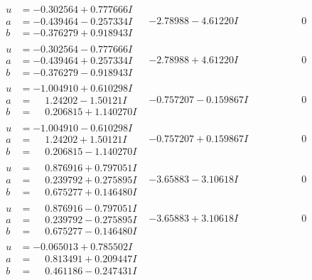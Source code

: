 \documentclass[1p]{elsarticle_modified}
\theoremstyle{definition}
\begin{document}
$$\begin{array}{c|c|c}
\begin{aligned}
u &= -0.302564 + 0.777666 I \\
a &= -0.439464 - 0.257334 I \\
b &= -0.376279 + 0.918943 I\end{aligned}
 & -2.78988 - 4.61220 I & \phantom{-0.000000 } 0 \\ \hline\begin{aligned}
u &= -0.302564 - 0.777666 I \\
a &= -0.439464 + 0.257334 I \\
b &= -0.376279 - 0.918943 I\end{aligned}
 & -2.78988 + 4.61220 I & \phantom{-0.000000 } 0 \\ \hline\begin{aligned}
u &= -1.004910 + 0.610298 I \\
a &= \phantom{-}1.24202 - 1.50121 I \\
b &= \phantom{-}0.206815 + 1.140270 I\end{aligned}
 & -0.757207 - 0.159867 I & \phantom{-0.000000 } 0 \\ \hline\begin{aligned}
u &= -1.004910 - 0.610298 I \\
a &= \phantom{-}1.24202 + 1.50121 I \\
b &= \phantom{-}0.206815 - 1.140270 I\end{aligned}
 & -0.757207 + 0.159867 I & \phantom{-0.000000 } 0 \\ \hline\begin{aligned}
u &= \phantom{-}0.876916 + 0.797051 I \\
a &= \phantom{-}0.239792 + 0.275895 I \\
b &= \phantom{-}0.675277 + 0.146480 I\end{aligned}
 & -3.65883 - 3.10618 I & \phantom{-0.000000 } 0 \\ \hline\begin{aligned}
u &= \phantom{-}0.876916 - 0.797051 I \\
a &= \phantom{-}0.239792 - 0.275895 I \\
b &= \phantom{-}0.675277 - 0.146480 I\end{aligned}
 & -3.65883 + 3.10618 I & \phantom{-0.000000 } 0 \\ \hline\begin{aligned}
u &= -0.065013 + 0.785502 I \\
a &= \phantom{-}0.813491 + 0.209447 I \\
b &= \phantom{-}0.461186 - 0.247431 I\end{aligned}

\end{array}$$
\end{document}

